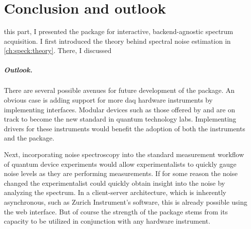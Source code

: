 \chapter{Conclusion and outlook}\label{ch:speck:conclusion}
 this part, I presented the \pyspeck \python package for interactive, backend-agnostic spectrum acquisition.
I first introduced the theory behind spectral noise estimation in \cref{ch:speck:theory}.
There, I discussed

\paragraph{Outlook.\label{par:speck:outlook}}
There are several possible avenues for future development of the \pyspeck package.
An obvious case is adding support for more \gls{daq} hardware instruments by implementing  interfaces.
Modular devices such as those offered by  and  are on track to become the new standard in quantum technology labs.
Implementing drivers for these instruments would benefit the adoption of both the instruments and the \pyspeck package.

Next, incorporating noise spectroscopy into the standard measurement workflow of quantum device experiments would allow experimentalists to quickly gauge noise levels as they are performing measurements.
If for some reason the noise changed
the experimentalist could quickly obtain insight into the noise by analyzing the spectrum.
In a client-server architecture, which is inherently asynchronous, such as Zurich Instrument's  software, this is already possible using the web interface.
But of course the strength of the \pyspeck package stems from its capacity to be utilized in conjunction with any hardware instrument.

